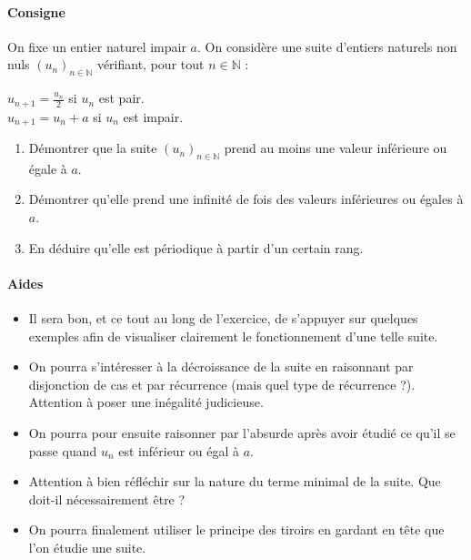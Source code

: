 \documentclass[a4paper]{report}
\begin{document}
				\begin{tcolorbox}[colback=white,colframe=black,title=Exercice - Une suite périodique]
				\paragraph{Consigne}
					On fixe un entier naturel impair $a$. On considère une suite d'entiers naturels non nuls $(u_n)_{n \in \mathbb{N}}$ vérifiant, pour tout $n \in \mathbb{N}$ :
					\vspace{3mm}
					\begin{center}
						$u_{n+1} = \frac{u_n}{2}$ si $u_n$ est pair.\\
						\vspace{1mm}
						$u_{n+1} = u_n + a$ si $u_n$ est impair.
					\end{center}
					\begin{enumerate}
					
						\item Démontrer que la suite $(u_n)_{n \in \mathbb{N}}$ prend au moins une valeur inférieure ou égale à $a$.
						\item Démontrer qu'elle prend une infinité de fois des valeurs inférieures ou égales à $a$.
						\item En déduire qu'elle est périodique à partir d'un certain rang.
					\end{enumerate}
					
				\tcblower					
					
				\paragraph{Aides}
					\begin{itemize}
						\item Il sera bon, et ce tout au long de l'exercice, de s'appuyer sur quelques exemples afin de visualiser clairement le fonctionnement d'une telle suite.
						\item On pourra s'intéresser à la décroissance de la suite en raisonnant par disjonction de cas et par récurrence (mais quel type de récurrence ?). Attention à poser une inégalité judicieuse.
						\item On pourra pour ensuite raisonner par l'absurde après avoir étudié ce qu'il se passe quand $u_n$ est inférieur ou égal à $a$.
						\item Attention à bien réfléchir sur la nature du terme minimal de la suite. Que doit-il nécessairement être ?
						\item On pourra finalement utiliser le principe des tiroirs en gardant en tête que l'on étudie une suite.
					\end{itemize}
				\end{tcolorbox}
		
\end{document}
